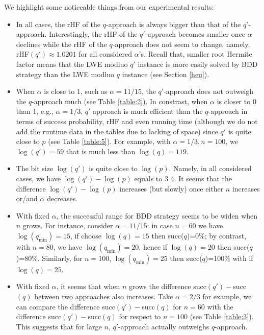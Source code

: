 \documentclass[runningheads]{llncs}
\begin{document}
We highlight some noticeable things from our experimental results:
\begin{itemize}
	\item In all cases, the rHF of the $q$-approach is always bigger than that of the $q'$-approach. Interestingly, the rHF of the $q'$-approach becomes smaller once $\alpha$ declines while the rHF of the $q$-approach does not seem to change, namely, rHF$(q') \approx 1.0201$ for all considered $\alpha$'s. Recall that, smaller root Hermite factor means that the LWE modluo $q'$ instance is more easily solved by BDD strategy than the LWE modluo $q$ instance (see Section \ref{heu}).
	\item When $\alpha$ is close to $1$, such as $\alpha=11/15$, the $q'$-approach does not outweigh the $q$-approach much (see Table \ref{table:2}). In constrast, when $\alpha$ is closer to 0 than 1, e.g., $\alpha=1/3$,  $q'$ approach is much efficient than the $q$-approach in terms of success probability, rHF and even running time (although we do not add the runtime data in the tables due to lacking of space) since $q'$ is quite close to $p$ (see Table \ref{table:5}). For example, with $\alpha=1/3, n=100$, we $\log (q')=59$ that is much less than $\log (q)=119$.
	\item The bit size $\log(q')$ is quite close to $\log(p)$. Namely, in all considered cases, we have $\log(q')-\log(p)$ equals to $3$  $4$. It seems that the difference $\log(q')-\log(p)$ increases (but slowly) once either $n$ increases or/and $\alpha$ decreases.   
	\item With fixed $\alpha$, the successful range for BDD strategy seems to be widen when $n$ grows. For instance, consider $\alpha=11/15$:  in case $n=60$ we have $\log({q_{\text{min}}})=15$, if choose $\log (q)=15$ then succ($q$)=0\%; by contrast, with $n=80$, we have $\log({q_{\text{min}}})=20$, hence if $\log (q)=20$ then succ($q$)=80\%. Similarly, for $n=100$, $\log({q_{\text{min}}})=25$ then succ($q$)=100\% with if $\log (q)=25$.

\item With fixed $\alpha$, it seems that when $n$ grows the difference succ$(q')-$succ$(q)$ between two approaches also increases. Take $\alpha=2/3$ for example, we can compare the  difference succ$(q')-$succ$(q)$ for $n=60$ with the difference succ$(q')-$succ$(q)$ for respect to $n=100$ (see Table \ref{table:3}). This suggests that for large $n$, $q'$-approach actually outweighs $q$-approach.


\end{itemize}
\end{document}
